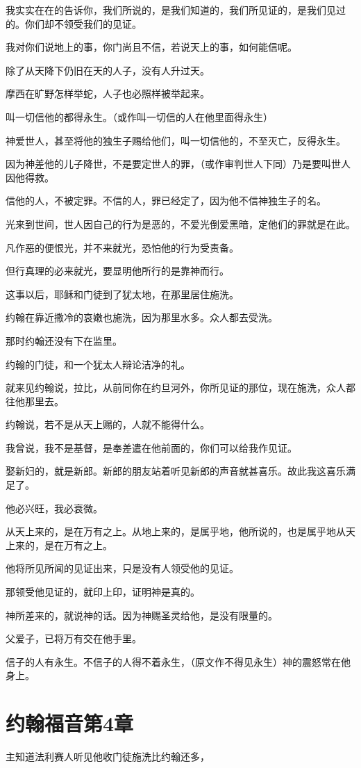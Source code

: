 \documentclass[12pt,oneside]{book}
\begin{document}
我实实在在的告诉你，我们所说的，是我们知道的，我们所见证的，是我们见过的。你们却不领受我们的见证。

我对你们说地上的事，你门尚且不信，若说天上的事，如何能信呢。

除了从天降下仍旧在天的人子，没有人升过天。

摩西在旷野怎样举蛇，人子也必照样被举起来。

叫一切信他的都得永生。（或作叫一切信的人在他里面得永生）

神爱世人，甚至将他的独生子赐给他们，叫一切信他的，不至灭亡，反得永生。

因为神差他的儿子降世，不是要定世人的罪，（或作审判世人下同）乃是要叫世人因他得救。

信他的人，不被定罪。不信的人，罪已经定了，因为他不信神独生子的名。

光来到世间，世人因自己的行为是恶的，不爱光倒爱黑暗，定他们的罪就是在此。

凡作恶的便恨光，并不来就光，恐怕他的行为受责备。

但行真理的必来就光，要显明他所行的是靠神而行。

这事以后，耶稣和门徒到了犹太地，在那里居住施洗。

约翰在靠近撒冷的哀嫩也施洗，因为那里水多。众人都去受洗。

那时约翰还没有下在监里。

约翰的门徒，和一个犹太人辩论洁净的礼。

就来见约翰说，拉比，从前同你在约旦河外，你所见证的那位，现在施洗，众人都往他那里去。

约翰说，若不是从天上赐的，人就不能得什么。

我曾说，我不是基督，是奉差遣在他前面的，你们可以给我作见证。

娶新妇的，就是新郎。新郎的朋友站着听见新郎的声音就甚喜乐。故此我这喜乐满足了。

他必兴旺，我必衰微。

从天上来的，是在万有之上。从地上来的，是属乎地，他所说的，也是属乎地从天上来的，是在万有之上。

他将所见所闻的见证出来，只是没有人领受他的见证。

那领受他见证的，就印上印，证明神是真的。

神所差来的，就说神的话。因为神赐圣灵给他，是没有限量的。

父爱子，已将万有交在他手里。

信子的人有永生。不信子的人得不着永生，（原文作不得见永生）神的震怒常在他身上。

\chapter{约翰福音第4章}
主知道法利赛人听见他收门徒施洗比约翰还多，
\end{document}
